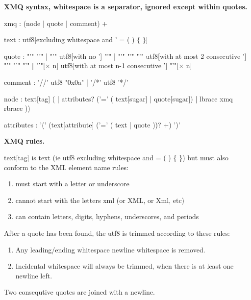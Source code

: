 \documentclass[10pt,a4paper]{article}
\begin{document}
\textbf{XMQ syntax, whitespace is a separator, ignored except within quotes.}

\begin{rail}
  xmq : (node | quote | comment) +
\end{rail}

\begin{rail}
  text : utf8[excluding whitespace and ' = ( ) $\lbrace$ $\rbrace$]
\end{rail}

\begin{rail}
  quote : "'" "'"
  | "'" utf8[with no '] "'"
  | "'" "'" "'" utf8[with at most 2 consecutive '] "'" "'" "'"
  | "'"[$\times$ n] utf8[with at most n-1 consecutive '] "'"[$\times$ n]
\end{rail}

\begin{rail}
  comment :  '//' utf8 "0x0a"
  | '/*' utf8 '*/'
\end{rail}

\begin{rail}
  node :  text[tag] ( | attributes? ('=' ( text[sugar] | quote[sugar]) | lbrace xmq rbrace ))
\end{rail}

\begin{rail}
  attributes : '(' (text[attribute] ('=' ( text | quote ))? +) ')'
\end{rail}

\newpage

\textbf{XMQ rules.}

text[tag] is text (ie utf8 excluding whitespace and = ( ) \{ \})
but must also conform to the XML element name rules:
\begin{enumerate}
  \item{must start with a letter or underscore}
  \item{cannot start with the letters xml (or XML, or Xml, etc)}
  \item{can contain letters, digits, hyphens, underscores, and periods}
\end{enumerate}

After a quote has been found, the utf8 is trimmed according to these rules:
\begin{enumerate}
\item{Any leading/ending whitespace newline whitespace is removed.}
\item{Incidental whitespace will always be trimmed, when there is at least one newline left.}
\end{enumerate}

Two consequtive quotes are joined with a newline.
\end{document}
